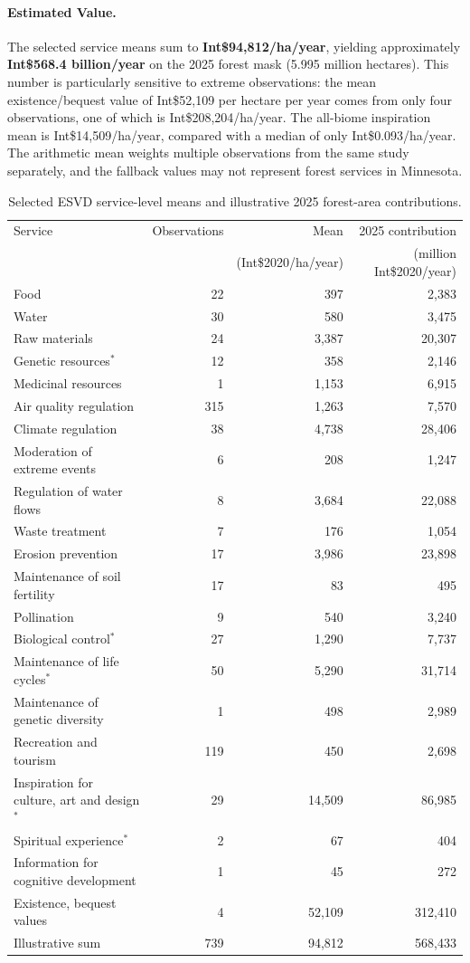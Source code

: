 \documentclass[11pt]{article}
\begin{document}
\paragraph{Estimated Value.}
The selected service means sum to \textbf{Int\$94,812/ha/year}, yielding approximately \textbf{Int\$568.4 billion/year} on the 2025 forest mask (5.995 million hectares). This number is particularly sensitive to extreme observations: the mean existence/bequest value of Int\$52,109 per hectare per year comes from only four observations, one of which is Int\$208,204/ha/year. The all-biome inspiration mean is Int\$14,509/ha/year, compared with a median of only Int\$0.093/ha/year. The arithmetic mean weights multiple observations from the same study separately, and the fallback values may not represent forest services in Minnesota.

\begin{table}[htbp]
\centering
\caption{Selected ESVD service-level means and illustrative 2025 forest-area contributions.}
\label{tab:esvd-implied}
\small
\begin{tabular}{@{}lrrr@{}}
\toprule
Service & Observations & Mean & 2025 contribution \\
 & & (Int\$2020/ha/year) & (million Int\$2020/year) \\
\midrule
Food & 22 & 397 & 2,383 \\
Water & 30 & 580 & 3,475 \\
Raw materials & 24 & 3,387 & 20,307 \\
Genetic resources$^*$ & 12 & 358 & 2,146 \\
Medicinal resources & 1 & 1,153 & 6,915 \\
Air quality regulation & 315 & 1,263 & 7,570 \\
Climate regulation & 38 & 4,738 & 28,406 \\
Moderation of extreme events & 6 & 208 & 1,247 \\
Regulation of water flows & 8 & 3,684 & 22,088 \\
Waste treatment & 7 & 176 & 1,054 \\
Erosion prevention & 17 & 3,986 & 23,898 \\
Maintenance of soil fertility & 17 & 83 & 495 \\
Pollination & 9 & 540 & 3,240 \\
Biological control$^*$ & 27 & 1,290 & 7,737 \\
Maintenance of life cycles$^*$ & 50 & 5,290 & 31,714 \\
Maintenance of genetic diversity & 1 & 498 & 2,989 \\
Recreation and tourism & 119 & 450 & 2,698 \\
Inspiration for culture, art and design$^*$ & 29 & 14,509 & 86,985 \\
Spiritual experience$^*$ & 2 & 67 & 404 \\
Information for cognitive development & 1 & 45 & 272 \\
Existence, bequest values & 4 & 52,109 & 312,410 \\
\midrule
Illustrative sum & 739 & 94,812 & 568,433 \\
\bottomrule
\end{tabular}


\end{table}
\end{document}
